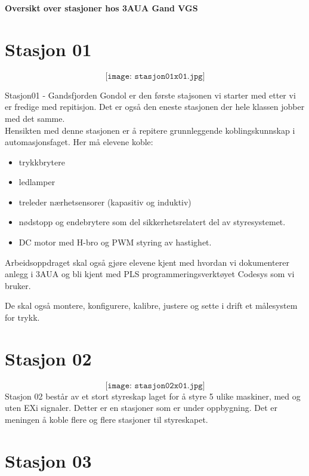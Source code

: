 
\noindent
\begin{center}
{\bf Oversikt over stasjoner hos 3AUA Gand VGS }
\end{center}
\vskip 5pt
\section{Stasjon 01}

$$\texttt{[image: stasjon01x01.jpg]}$$

Stasjon01 - Gandsfjorden Gondol er den første stajsonen vi starter med etter vi er fredige med repitisjon. Det er også den eneste stasjonen der hele klassen jobber med det samme. \\

Hensikten med denne stasjonen er å repitere grunnleggende koblingskunnskap i automasjonsfaget. Her må elevene koble:
\begin{itemize}[noitemsep]
	\item trykkbrytere
	\item ledlamper
	\item treleder nærhetsensorer (kapasitiv og induktiv)
	\item nødstopp og endebrytere som del sikkerhetsrelatert del av styresystemet. 
	\item DC motor med H-bro og PWM styring av hastighet. 
\end{itemize}




Arbeidsoppdraget skal også gjøre elevene kjent med hvordan vi dokumenterer anlegg i 3AUA og bli kjent med PLS programmeringsverktøyet Codesys som vi bruker. 

De skal også montere, konfigurere, kalibre, justere og sette i drift et målesystem for trykk. 

\section{Stasjon 02}

$$\texttt{[image: stasjon02x01.jpg]}$$
Stasjon 02 består av et stort styreskap laget for å styre 5 ulike maskiner, med og uten EXi signaler. Detter er en stasjoner som er under oppbygning. Det er meningen å koble flere og flere stasjoner til  styreskapet. \\




\section{Stasjon 03}


